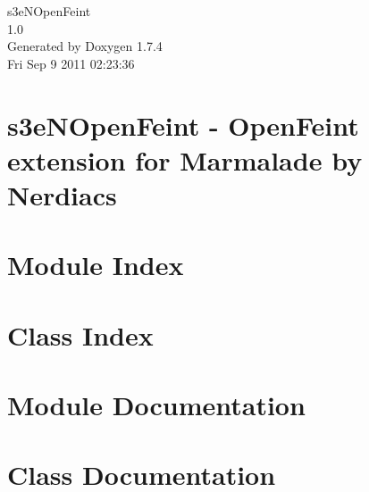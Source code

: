 \documentclass[a4paper]{book}
\begin{document}
\hypersetup{pageanchor=false}
\begin{titlepage}
\vspace*{7cm}
\begin{center}
{\Large s3eNOpenFeint \\[1ex]\large 1.0 }\\
\vspace*{1cm}
{\large Generated by Doxygen 1.7.4}\\
\vspace*{0.5cm}
{\small Fri Sep 9 2011 02:23:36}\\
\end{center}
\end{titlepage}
\clearemptydoublepage
{}
\tableofcontents
\clearemptydoublepage
{}
\hypersetup{pageanchor=true}
\chapter{s3eNOpenFeint -\/ OpenFeint extension for Marmalade by Nerdiacs}
\label{index}\hypertarget{index}{}
\chapter{Module Index}

\chapter{Class Index}

\chapter{Module Documentation}


\chapter{Class Documentation}










\printindex
\end{document}
